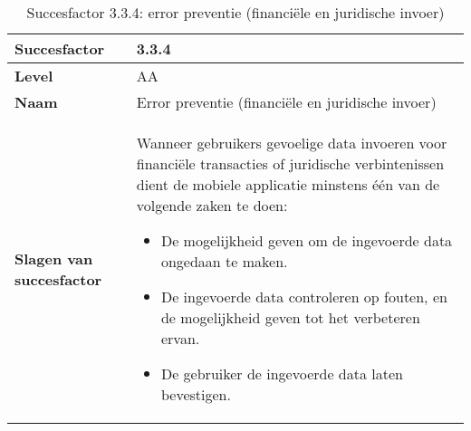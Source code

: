 \begin{table}[H]
    \centering
    \caption{Succesfactor 3.3.4: error preventie (financiële en juridische invoer)}
    
    
    \hspace*{-1cm}\begin{tabular}{|l|p{12cm}|} 
        \hline
        \textbf{Succesfactor}                 & 3.3.4                                                                                                                                                                                                                                                                                                                                                                                                                                                                                                        \\ 
        \hline
        \textbf{Level}                        & AA                                                                                                                                                                                                                                                                                                                                                                                                                                                                                                               \\ 
        \hline
        \textbf{Naam}                         & Error preventie (financiële en juridische invoer)~                                                                                                                                                                                                                                                                                                                                                                                                                                                                                      \\ 
        \hline
        \textbf{Slagen van succesfactor}      & Wanneer gebruikers gevoelige data invoeren voor financiële transacties of juridische verbintenissen dient de mobiele applicatie minstens één van de volgende zaken te doen: \begin{itemize}
            \item De mogelijkheid geven om de ingevoerde data ongedaan te maken.
            \item De ingevoerde data controleren op fouten, en de mogelijkheid geven tot het verbeteren ervan.
            \item De gebruiker de ingevoerde data laten bevestigen.
        \end{itemize}
        \\  
        

\end{tabular}
\end{table}
